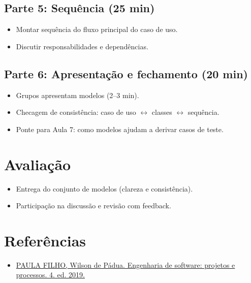 \documentclass[12pt,a4paper]{article}
\begin{document}
\subsection*{Parte 5: Sequência (25 min)}
\begin{itemize}[leftmargin=*,itemsep=0.35em]
  \item Montar sequência do fluxo principal do caso de uso.
  \item Discutir responsabilidades e dependências.
\end{itemize}

\subsection*{Parte 6: Apresentação e fechamento (20 min)}
\begin{itemize}[leftmargin=*,itemsep=0.35em]
  \item Grupos apresentam modelos (2--3 min).
  \item Checagem de consistência: caso de uso $\leftrightarrow$ classes $\leftrightarrow$ sequência.
  \item Ponte para Aula 7: como modelos ajudam a derivar casos de teste.
\end{itemize}

\section{Avaliação}
\begin{itemize}[leftmargin=*,itemsep=0.25em]
  \item Entrega do conjunto de modelos (clareza e consistência).
  \item Participação na discussão e revisão com feedback.
\end{itemize}

\section{Referências}
\begin{itemize}[leftmargin=*,itemsep=0.25em]
  \item \href{../99-Materiais/Engenharia%20de%20software%20projetos%20e%20processos%20by%20Wilson%20de%20P%C3%A1dua%20Paula%20Filho%20.epub.pdf}{PAULA FILHO, Wilson de Pádua. Engenharia de software: projetos e processos. 4. ed. 2019.}
\end{itemize}
\end{document}
